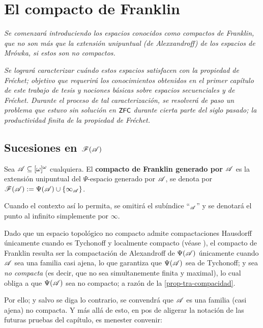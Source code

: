 \chapter{El compacto de Franklin}
	\emph{\small Se comenzará introduciendo los espacios conocidos como \textit{compactos de Franklin}, que no son más que la extensión unipuntual (de Alexxandroff) de los espacios de Mrówka, si estos son no compactos.}

	\emph{\small Se logrará caracterizar cuándo estos espacios satisfacen con la propiedad de Fréchet; objetivo que requerirá los conocimientos obtenidos en el primer capítulo de este trabajo de tesis y nociones básicas sobre espacios secuenciales y de Fréchet. Durante el proceso de tal caracterización, se resolverá de paso un problema que estuvo sin solución en $\text{\textsf{\small ZFC}}$ durante cierta parte del siglo pasado; la productividad finita de la propiedad de Fréchet.}

	\section{\texorpdfstring{Sucesiones en $\mathscr{F}(\mathscr{A})$}{Sucesiones en F(A)}}
	\label{Subsec-sucesiones-Franklin}
	
	\begin{definicion}
		Sea $\mathscr{A}\subseteq [\omega]^\omega$ cualquiera. El \textbf{compacto de Franklin generado por $\mathscr{A}$} es la extensión unipuntual del $\Psi$-espacio generado por $\mathscr{A}$, se denota por $ \mathscr{F}(\mathscr{A}):=\Psi(\mathscr{A}) \cup \{\infty_{\mathscr{A}} \} $.
		
		Cuando el contexto así lo permita, se omitirá el subíndice ``$_{\mathscr{A}}$'' y se denotará el punto al infinito simplemente por $\infty$.
	\end{definicion}
	
	Dado que un espacio topológico no compacto admite compactaciones Hausdorff únicamente cuando es Tychonoff y localmente compacto (véase \cite[p.~ 221]{fidelElementos}), el compacto de Franklin resulta ser la compactación de Alexandroff de $\Psi(\mathscr{A})$ únicamente cuando $\mathscr{A}$ sea una familia casi ajena, lo que garantiza que $\Psi(\mathscr{A})$ sea de Tychonoff; y sea \textit{no compacta} (es decir, que no sea simultanemente finita y maximal), lo cual obliga a que $\Psi(\mathscr{A})$ sea no compacto; a razón de la \autoref{prop-tra-compacidad}.

	Por ello; y salvo se diga lo contrario, se convendrá que $\mathscr{A}$ es una familia (casi ajena) no compacta. Y más allá de esto, en pos de aligerar la notación de las futuras pruebas del capítulo, es menester convenir: 

